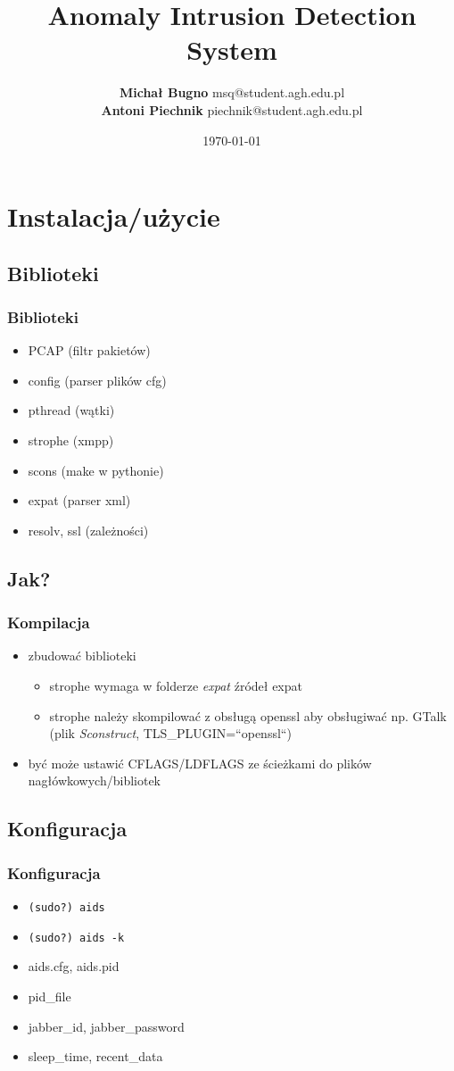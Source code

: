 \documentclass{beamer}
\title{Anomaly Intrusion Detection System}
\author[Michał Bugno \and Antoni Piechnik]
{
  \textbf{Michał Bugno} msq@student.agh.edu.pl \\
  \textbf{Antoni Piechnik} piechnik@student.agh.edu.pl
}
\date{\today}
\begin{document}
\maketitle

\section{Instalacja/użycie}
\subsection{Biblioteki}
\begin{frame}
\frametitle{Biblioteki}
	\begin{itemize}
	\item PCAP (filtr pakietów)
	\item config (parser plików cfg)
	\item pthread (wątki)
	\item strophe (xmpp)
	\item scons (make w pythonie)
	\item expat (parser xml)
	\item resolv, ssl (zależności)
	\end{itemize}
\end{frame}

\subsection{Jak?}
\begin{frame}
\frametitle{Kompilacja}
	\begin{itemize}
	\item zbudować biblioteki
	\begin{itemize}
		\item strophe wymaga w folderze \emph{expat} źródeł expat
		\item strophe należy skompilować z obsługą openssl aby obsługiwać np. GTalk (plik \emph{Sconstruct}, TLS\_PLUGIN=``openssl``)
	\end{itemize}
	\item być może ustawić CFLAGS/LDFLAGS ze ścieżkami do plików nagłówkowych/bibliotek
	\end{itemize}
\end{frame}

\subsection{Konfiguracja}
\begin{frame}
\frametitle{Konfiguracja}
	\begin{itemize}
	\item \texttt{(sudo?) aids}
	\item \texttt{(sudo?) aids -k}
	\item aids.cfg, aids.pid
	\item pid\_file
	\item jabber\_id, jabber\_password
	\item sleep\_time, recent\_data
	\end{itemize}
\end{frame}
\end{document}
